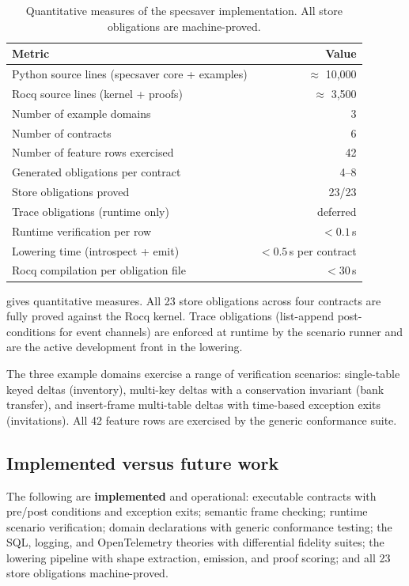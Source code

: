 \documentclass[11pt,a4paper]{article}
\begin{document}
\begin{table}[t]
\centering\small
\begin{tabular}{@{}lr@{}}
\toprule
\textbf{Metric} & \textbf{Value} \\
\midrule
Python source lines (specsaver core + examples) & $\approx$ 10,000 \\
Rocq source lines (kernel + proofs) & $\approx$ 3,500 \\
Number of example domains & 3 \\
Number of contracts & 6 \\
Number of feature rows exercised & 42 \\
Generated obligations per contract & 4--8 \\
Store obligations proved & 23/23 \\
Trace obligations (runtime only) & deferred \\
Runtime verification per row & $< 0.1$\,s \\
Lowering time (introspect + emit) & $< 0.5$\,s per contract \\
Rocq compilation per obligation file & $< 30$\,s \\
\bottomrule
\end{tabular}
\caption{Quantitative measures of the \textsf{specsaver} implementation.
All store obligations are machine-proved.}
\label{tab:metrics}
\end{table}

 gives quantitative measures.  All 23 store
obligations across four contracts are fully proved against the Rocq
kernel.  Trace obligations (list-append post-conditions for event
channels) are enforced at runtime by the scenario runner and are the
active development front in the lowering.

The three example domains exercise a range of verification scenarios:
single-table keyed deltas (inventory), multi-key deltas with a
conservation invariant (bank transfer), and insert-frame multi-table
deltas with time-based exception exits (invitations).  All 42 feature
rows are exercised by the generic conformance suite.

\subsection{Implemented versus future work}

The following are \textbf{implemented} and operational: executable
contracts with pre/post conditions and exception exits; semantic frame
checking; runtime scenario verification; domain declarations with
generic conformance testing; the SQL, logging, and OpenTelemetry
theories with differential fidelity suites; the lowering pipeline with
shape extraction, emission, and proof scoring; and all 23 store
obligations machine-proved.
\end{document}

